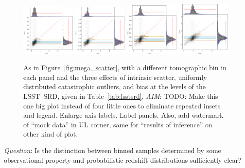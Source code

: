 \documentclass[iop]{emulateapj}
\newcommand{\todo}[3]{{\color{#2}\emph{#1}: #3}}
\newcommand{\aim}[1]{\todo{AIM}{red}{#1}}
\newcommand{\que}[1]{\todo{Question}{cyan}{#1}}
\newcommand{\Fig}[1]{Figure~\ref{#1}}
\newcommand{\project}[1]{\textsc{#1}}
\newcommand{\lsst}{\project{LSST}}
\begin{document}
\begin{figure}
	\begin{center}
		\includegraphics[width=0.24\textwidth]{figures/chippr/0single_lsst_mega_scatter.png}
		\includegraphics[width=0.24\textwidth]{figures/chippr/1single_lsst_mega_scatter.png}
		\includegraphics[width=0.24\textwidth]{figures/chippr/2single_lsst_mega_scatter.png}
		\includegraphics[width=0.24\textwidth]{figures/chippr/3single_lsst_mega_scatter.png}
		\caption{As in \Fig{fig:mega_scatter}, with a different tomographic bin in each panel and the three effects of intrinsic scatter, uniformly distributed catastrophic outliers, and bias at the levels of the \lsst\ SRD, given in Table~\ref{tab:lsstsrd}.
		\aim{TODO: Make this one big plot instead of four little ones to eliminate repeated insets and legend.
		Enlarge axis labels.
		Label panels.
		Also, add watermark of ``mock data'' in UL corner, same for ``results of inference'' on other kind of plot.}
		}
		\label{fig:per-bin-scatter}
	\end{center}
\end{figure}

\que{Is the distinction between binned samples determined by some observational property and probabilistic redshift distributions sufficiently clear?}
\end{document}
